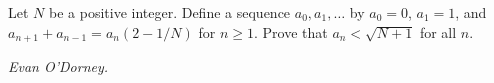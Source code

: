 Let $N$ be a positive integer. Define a sequence $a_0,a_1,\ldots$ by $a_0=0$, $a_1=1$, and $a_{n+1}+a_{n-1}=a_n(2-1/N)$ for $n\ge1$. Prove that $a_n<\sqrt{N+1}$ for all $n$.

\textit{Evan O'Dorney.}